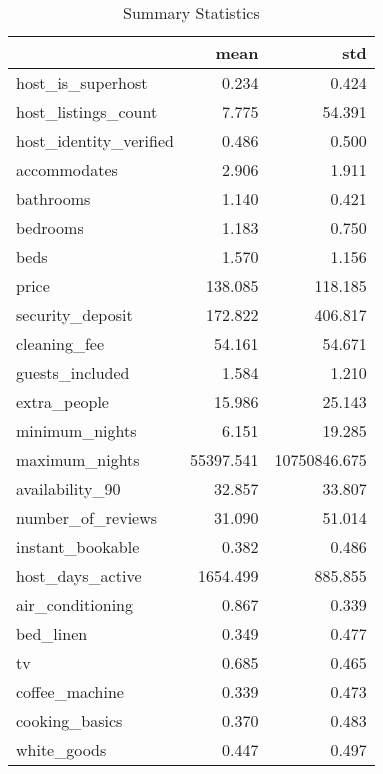 \begin{table}[htp]
    \centering
    \caption{Summary Statistics}
    \label{tab:descriptive-statistic}
{\small

\begin{tabular}{lrr}
\toprule
{} &      mean &          std \\
\midrule
host\_is\_superhost      &     0.234 &        0.424 \\
host\_listings\_count    &     7.775 &       54.391 \\
host\_identity\_verified &     0.486 &        0.500 \\
accommodates           &     2.906 &        1.911 \\
bathrooms              &     1.140 &        0.421 \\
bedrooms               &     1.183 &        0.750 \\
beds                   &     1.570 &        1.156 \\
price                  &   138.085 &      118.185 \\
security\_deposit       &   172.822 &      406.817 \\
cleaning\_fee           &    54.161 &       54.671 \\
guests\_included        &     1.584 &        1.210 \\
extra\_people           &    15.986 &       25.143 \\
minimum\_nights         &     6.151 &       19.285 \\
maximum\_nights         & 55397.541 & 10750846.675 \\
availability\_90        &    32.857 &       33.807 \\
number\_of\_reviews      &    31.090 &       51.014 \\
instant\_bookable       &     0.382 &        0.486 \\
host\_days\_active       &  1654.499 &      885.855 \\
air\_conditioning       &     0.867 &        0.339 \\
bed\_linen              &     0.349 &        0.477 \\
tv                     &     0.685 &        0.465 \\
coffee\_machine         &     0.339 &        0.473 \\
cooking\_basics         &     0.370 &        0.483 \\
white\_goods            &     0.447 &        0.497 \\

\end{tabular}}
\end{table}
